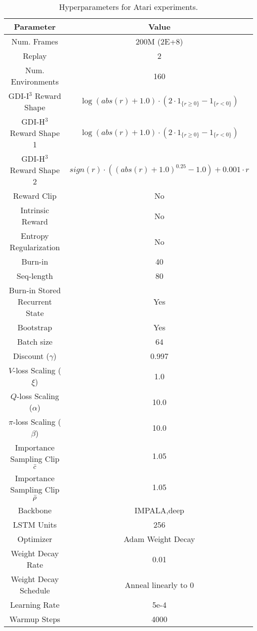 \documentclass[nohyperref]{article}
\theoremstyle{plain}
\begin{document}
\begin{table}[H]
\begin{center}
\caption{Hyperparameters for Atari experiments.}
\label{tab:fixed_model_hyperparameters_atari}
\begin{tabular}{|c|c|}
\hline
\textbf{Parameter} & \textbf{Value}  \\
\hline
Num. Frames & 200M (2E+8) \\
\hline
Replay & 2 \\
\hline
Num. Environments & 160 \\
\hline
GDI-I$^3$ Reward Shape & $\log (abs (r) + 1.0) \cdot (2 \cdot 1_{\{r \geq 0\}} - 1_{\{r < 0\}})$ \\
\hline
GDI-H$^3$ Reward Shape 1 & $\log (abs (r) + 1.0) \cdot (2 \cdot 1_{\{r \geq 0\}} - 1_{\{r < 0\}})$ \\
\hline
GDI-H$^3$ Reward Shape 2 & $sign(r) \cdot ((abs (r) + 1.0)^{0.25} - 1.0) + 0.001 \cdot r$ \\
\hline
Reward Clip & No \\
\hline
Intrinsic Reward & No \\
\hline
Entropy Regularization & No \\
\hline
Burn-in & 40 \\
\hline
Seq-length & 80 \\
\hline
Burn-in Stored Recurrent State & Yes \\
\hline
Bootstrap & Yes \\
\hline
Batch size & 64 \\
\hline
Discount ($\gamma$) & 0.997 \\
\hline
$V$-loss Scaling ($\xi$) & 1.0 \\
\hline
$Q$-loss Scaling ($\alpha$) & 10.0 \\
\hline
$\pi$-loss Scaling ($\beta$) & 10.0 \\
\hline
Importance Sampling Clip $\Bar{c}$ & 1.05 \\
\hline
Importance Sampling Clip $\Bar{\rho}$ & 1.05 \\
\hline
Backbone & IMPALA,deep \\
\hline
LSTM Units & 256 \\
\hline
Optimizer & Adam Weight Decay \\
\hline
Weight Decay Rate & 0.01 \\
\hline
Weight Decay Schedule & Anneal linearly to 0 \\
\hline
Learning Rate & 5e-4 \\
\hline
Warmup Steps & 4000 \\

\end{tabular}
\end{center}
\end{table}
\end{document}
